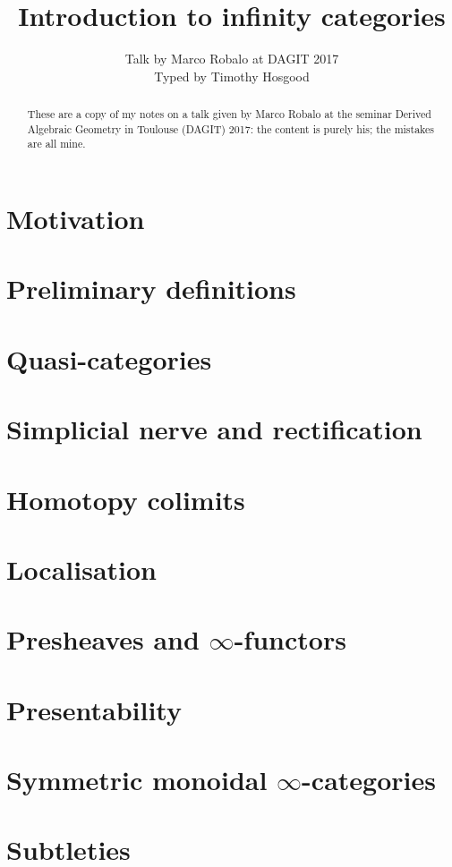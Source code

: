 \documentclass{article}
\title{Introduction to infinity categories}
\author{Talk by Marco Robalo at DAGIT 2017\\Typed by Timothy Hosgood}
\date{\displaydate{date}}
\numberwithin{equation}{subsection}
\begin{document}
    \maketitle

    \begin{abstract}
        These are a copy of my notes on a talk given by Marco Robalo at the seminar Derived Algebraic Geometry in Toulouse (DAGIT) 2017: the content is purely his; the mistakes are all mine.
    \end{abstract}

    \section{Motivation}

    \section{Preliminary definitions}

    \section{Quasi-categories}

    \section{Simplicial nerve and rectification}

    \section{Homotopy colimits}

    \section{Localisation}

    \section{Presheaves and $\infty$-functors}

    \section{Presentability}

    \section{Symmetric monoidal $\infty$-categories}

    \section{Subtleties}
\end{document}
